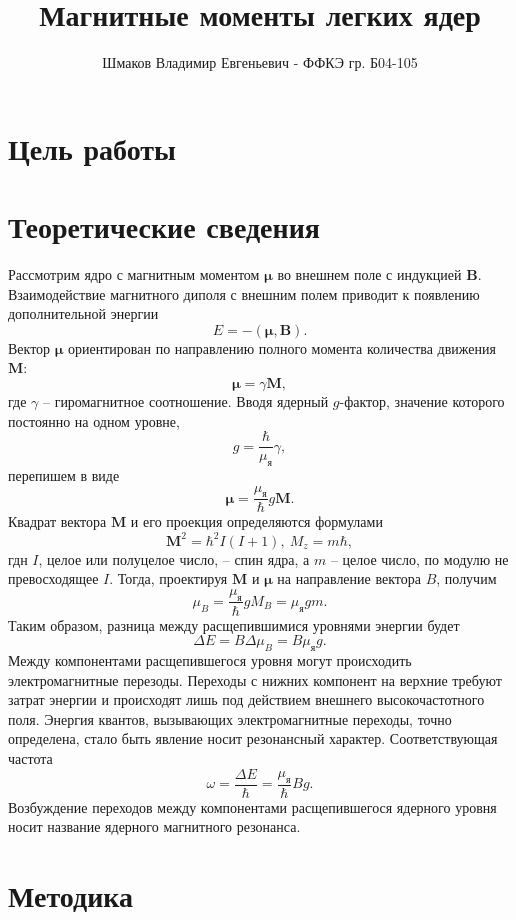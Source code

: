 \documentclass[a4paper, 14pt]{article}
\title{\textcolor{main_title}{Магнитные моменты легких ядер}}
\author{Шмаков Владимир Евгеньевич - ФФКЭ гр. Б04-105}
\begin{document}
\maketitle



\section*{\textcolor{header}{Цель работы}}



\section*{\textcolor{header}{Теоретические сведения}}

Рассмотрим ядро с магнитным моментом $\boldsymbol{\mu}$ во внешнем поле с индукцией $\mathbf{B}$. Взаимодействие магнитного диполя с внешним полем приводит к появлению дополнительной энергии 
\[
E = -(\boldsymbol{\mu},\mathbf{B}).
\]
Вектор $\boldsymbol{\mu}$ ориентирован по направлению полного момента количества движения $\mathbf{M}$:
\[
\boldsymbol{\mu} = \gamma \mathbf{M},
\]
где $\gamma$ -- гиромагнитное соотношение. Вводя ядерный $g$-фактор, значение которого постоянно на одном уровне,
\[
g = \dfrac{\hbar}{\mu_\text{я}}\gamma,
\]
перепишем в виде
\[
\boldsymbol{\mu} = \dfrac{\mu_\text{я}}{\hbar}g\mathbf{M}.
\]
Квадрат вектора $\mathbf{M}$ и его проекция определяются формулами
\[
\mathbf{M}^2 = \hbar^2 I(I+1),~M_z = m\hbar,
\]
гдн $I$, целое или полуцелое число, -- спин ядра, а $m$ -- целое число, по модулю не превосходящее $I$. Тогда, проектируя $\mathbf{M}$ и $\boldsymbol{\mu}$ на направление вектора $B$, получим
\[
\mu_B = \dfrac{\mu_\text{я}}{\hbar}g M_B = \mu_\text{я} g m.
\]
Таким образом, разница между расщепившимися уровнями энергии будет
\[
\Delta E = B\Delta \mu_B = B \mu_\text{я} g.
\]
Между компонентами расщепившегося уровня могут происходить электромагнитные перезоды. Переходы с нижних компонент на верхние требуют затрат энергии и происходят лишь под действием внешнего высокочастотного поля. Энергия квантов, вызывающих электромагнитные переходы, точно определена, стало быть явление носит резонансный характер. Соответствующая частота 
\begin{equation}
\omega = \dfrac{\Delta E}{\hbar} = \dfrac{\mu_\text{я}}{\hbar}Bg.
\end{equation}
Возбуждение переходов между компонентами расщепившегося ядерного уровня носит название \textcolor{defenition}{ядерного магнитного резонанса}.
\section*{\textcolor{header}{Методика}}
\end{document}
